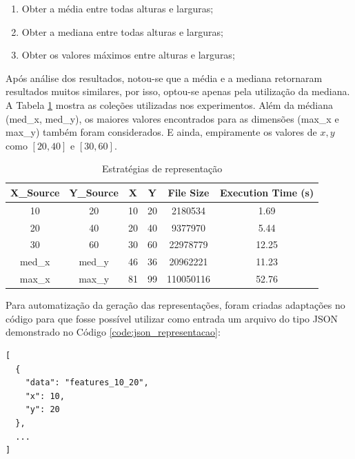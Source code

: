 \documentclass[12pt]{article}
\begin{document}
\begin{enumerate}
  \item Obter a média entre todas alturas e larguras;
  \item Obter a mediana entre todas alturas e larguras;
  \item Obter os valores máximos entre alturas e larguras;
\end{enumerate}

Após análise dos resultados, notou-se que a média e a mediana retornaram resultados muitos similares, por isso, optou-se apenas pela utilização da mediana. A Tabela \ref{tab:estrategias_representacao} mostra as coleções utilizadas nos experimentos. Além da médiana (med\_x, med\_y), os maiores valores encontrados para as dimensões (max\_x e max\_y) também foram considerados. E ainda, empiramente os valores de $x,y$ como $[20,40]$ e $[30,60]$.

\begin{table}[!htb]
  \centering
  \begin{tabular}{|c|c|c|c|c|c|}
  \hline
  \textbf{X\_Source} & \textbf{Y\_Source} & \textbf{X} & \textbf{Y} & \textbf{File Size} & \textbf{Execution Time (s)} \\ \hline
  10                 & 20                 & 10         & 20         & 2180534            & 1.69                    \\ \hline
  20                 & 40                 & 20         & 40         & 9377970            & 5.44                    \\ \hline
  30                 & 60                 & 30         & 60         & 22978779           & 12.25                   \\ \hline
  med\_x             & med\_y             & 46         & 36         & 20962221           & 11.23                   \\ \hline
  max\_x             & max\_y             & 81         & 99         & 110050116          & 52.76                   \\ \hline
  \end{tabular}
  \caption{Estratégias de representação}
  \label{tab:estrategias_representacao}
\end{table}

Para automatização da geração das representações, foram criadas adaptações no código para que fosse possível utilizar como entrada um arquivo do tipo JSON demonstrado no Código \ref{code:json_representacao}:

\begin{lstlisting}[caption={JSON para representações},captionpos=b,frame=single,label={code:json_representacao}]
[
  {
    "data": "features_10_20",
    "x": 10,
    "y": 20
  },
  ...
]
\end{lstlisting}
\end{document}
